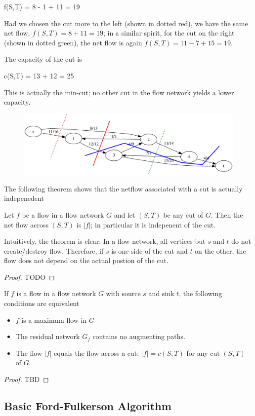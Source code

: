 \bee
f(S,T) = 8 - 1 + 11 = 19 
\eee

Had we chosen the cut more to the left (shown in dotted red), we have the same net flow, $f(S,T) = 8 + 11 = 19$; in a similar spirit, for the cut on the right (shown in dotted green), the net flow is again $f(S,T) = 11 - 7 + 15 = 19$.

The capacity of the cut is

\bee
c(S,T) = 13 + 12 = 25
\eee

This is actually the min-cut; no other cut in the flow network yields a lower capacity.


\begin{figure}[H] \centering
\includegraphics[scale=0.6]{images/max_flow_03.png}
\end{figure}


The following theorem shows that the netflow associated with a cut is actually indepenedent 

\begin{theorem}
  Let $f$ be a flow in a flow network $G$ and let $(S,T)$ be any cut of $G$. Then the net flow across $(S,T)$ is $|f|$; in particular it is indepenent of the cut.
\end{theorem}

Intuitively, the theorem is clear: In a flow network, all vertices but $s$ and $t$ do not create/destroy flow. Therefore, if $s$ is one side of the cut and $t$ on the other, the flow does not depend on the actual postion of the cut. 

\begin{proof}
  TODO
\end{proof}

\begin{theorem}
  If $f$ is a flow in a flow network $G$ with source $s$ and sink $t$, the following conditions are equivalent
  \begin{itemize}
  \item $f$ is a maximum flow in $G$
  \item The residual network $G_f$ contains no augmenting paths.
  \item The flow $|f|$ equals the flow across a cut: $|f| = c(S,T)$ for any cut $(S,T)$ of $G$.
  \end{itemize}
\end{theorem}

\begin{proof}
  TBD
\end{proof}

\subsection{Basic Ford-Fulkerson Algorithm}




